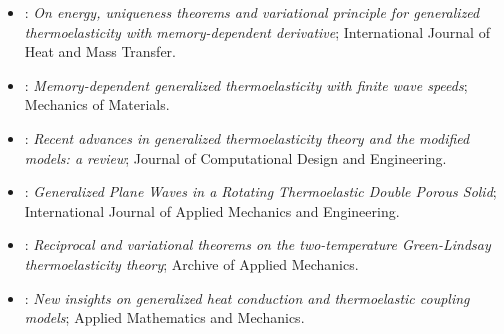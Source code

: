 \begin{itemize}
\item \citet{Sarkar2020a}: \emph{On energy, uniqueness theorems and variational principle for generalized thermoelasticity with memory-dependent derivative}; International Journal of Heat and Mass Transfer.
\item \citet{Sarkar2021}: \emph{Memory-dependent generalized thermoelasticity with finite wave speeds}; Mechanics of Materials.
\item \citet{Shakeriaski2021}: \emph{Recent advances in generalized thermoelasticity theory and the modified models: a review}; Journal of Computational Design and Engineering.
\item \citet{Pathania2022}: \emph{Generalized Plane Waves in a Rotating Thermoelastic Double Porous Solid}; International Journal of Applied Mechanics and Engineering.
\item \citet{Sachan2022}: \emph{Reciprocal and variational theorems on the two-temperature Green-Lindsay thermoelasticity theory}; Archive of Applied Mechanics.
\item \citet{Huang2025}: \emph{New insights on generalized heat conduction and thermoelastic coupling models}; Applied Mathematics and Mechanics.
\end{itemize}
